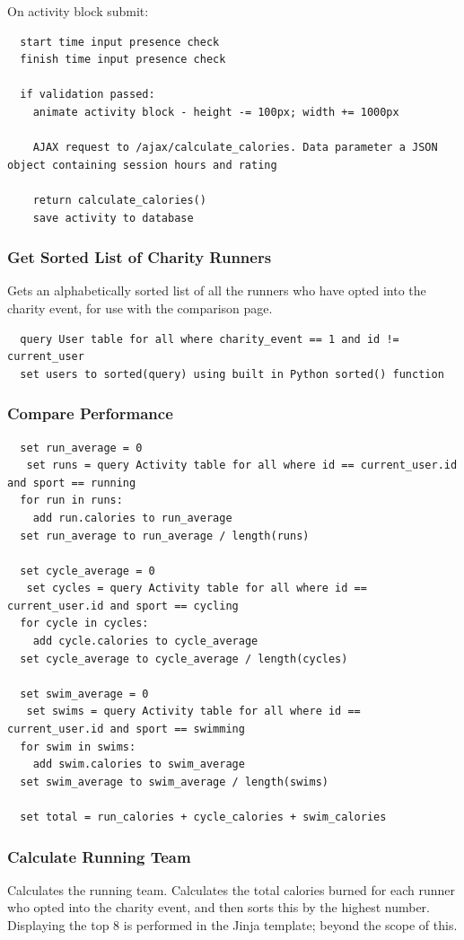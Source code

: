 \documentclass{article}[12pt,a4paper]
\begin{document}
\noindent
On activity block submit:
\begin{verbatim}
  start time input presence check
  finish time input presence check

  if validation passed:
    animate activity block - height -= 100px; width += 1000px

    AJAX request to /ajax/calculate_calories. Data parameter a JSON object containing session hours and rating

    return calculate_calories()
    save activity to database
\end{verbatim}

\subsubsection{Get Sorted List of Charity Runners}
Gets an alphabetically sorted list of all the runners who have opted into the charity event, for use with the comparison page.

\begin{verbatim}
  query User table for all where charity_event == 1 and id != current_user
  set users to sorted(query) using built in Python sorted() function
\end{verbatim}

\subsubsection{Compare Performance}

\begin{verbatim}
  set run_average = 0
   set runs = query Activity table for all where id == current_user.id and sport == running
  for run in runs:
    add run.calories to run_average
  set run_average to run_average / length(runs)

  set cycle_average = 0
   set cycles = query Activity table for all where id == current_user.id and sport == cycling
  for cycle in cycles:
    add cycle.calories to cycle_average
  set cycle_average to cycle_average / length(cycles)

  set swim_average = 0
   set swims = query Activity table for all where id == current_user.id and sport == swimming
  for swim in swims:
    add swim.calories to swim_average
  set swim_average to swim_average / length(swims)

  set total = run_calories + cycle_calories + swim_calories
\end{verbatim}


\subsubsection{Calculate Running Team}
Calculates the running team. Calculates the total calories burned for each runner who opted into the charity event, and then sorts this by the highest number. Displaying the top 8 is performed in the Jinja template; beyond the scope of this.
\end{document}

